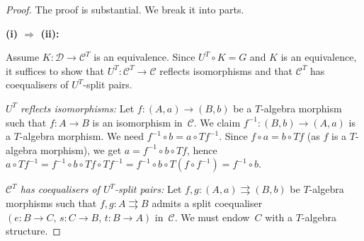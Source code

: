 \begin{proof}
The proof is substantial.  We break it into parts.

\medskip\noindent
\textbf{(i) $\Rightarrow$ (ii):}

Assume $K\colon\mathcal{D}\to\mathcal{C}^T$ is an equivalence.
Since $U^T\circ K = G$ and $K$ is an equivalence, it suffices to
show that $U^T\colon\mathcal{C}^T\to\mathcal{C}$ reflects isomorphisms
and that $\mathcal{C}^T$ has coequalisers of $U^T$-split pairs.

\emph{$U^T$ reflects isomorphisms:}
Let $f\colon(A,a)\to(B,b)$ be a $T$-algebra morphism such that
$f\colon A\to B$ is an isomorphism in~$\mathcal{C}$.
We claim $f^{-1}\colon(B,b)\to(A,a)$ is a $T$-algebra morphism.
We need $f^{-1}\circ b = a\circ Tf^{-1}$.  Since $f\circ a = b\circ Tf$
(as $f$ is a $T$-algebra morphism), we get
$a = f^{-1}\circ b\circ Tf$, hence
$a\circ Tf^{-1} = f^{-1}\circ b\circ Tf\circ Tf^{-1}
= f^{-1}\circ b\circ T(f\circ f^{-1}) = f^{-1}\circ b$.

\emph{$\mathcal{C}^T$ has coequalisers of $U^T$-split pairs:}
Let $f,g\colon(A,a)\rightrightarrows(B,b)$ be $T$-algebra morphisms
such that $f,g\colon A\rightrightarrows B$ admits a split coequaliser
$(e\colon B\to C,\, s\colon C\to B,\, t\colon B\to A)$ in~$\mathcal{C}$.
We must endow~$C$ with a $T$-algebra structure.


\end{proof}
